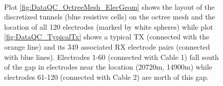 \documentclass[final,authoryear,5p,times,twocolumn]{elsarticle}
\begin{document}
\begin{figure} [!ht]
    \begin{center}
     \\%
    \end{center}
\caption{Plot \ref{fig:DataQC_OctreeMesh_ElecGeom} shows the layout of the discretized tunnels (blue resistive cells) on the octree mesh and the location of all 120 electrodes (marked by white spheres) while plot \ref{fig:DataQC_TypicalTx} shows a typical TX (connected with the orange line) and its 349 associated RX electrode pairs (connected with blue lines). Electrodes 1-60 (connected with Cable 1) fall south of the gap in electrodes near the location (20720m, 14900m) while electrodes 61-120 (connected with Cable 2) are north of this gap.} 
\label{fig:DataQC_Layout}
\end{figure}
\end{document}
